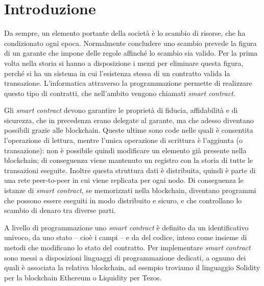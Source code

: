 \documentclass[12pt,a4paper]{report}
\begin{document}


\setcounter{secnumdepth}{3}
\setcounter{tocdepth}{1}
\tableofcontents

\hypertarget{introduzione}{%
\chapter{Introduzione}\label{introduzione}}

Da sempre, un elemento portante della società è lo scambio di risorse,
che ha condizionato ogni epoca. Normalmente concludere uno scambio
prevede la figura di un garante che impone delle regole affinché lo
scambio sia valido. Per la prima volta nella storia si hanno a
disposizione i mezzi per eliminare questa figura, perché si ha un
sistema in cui l'esistenza stessa di un contratto valida la transazione.
L'informatica attraverso la programmazione permette di realizzare questo
tipo di contratti, che nell'ambito vengono chiamati \emph{smart
contract}.

Gli \emph{smart contract} devono garantire le proprietà di fiducia,
affidabilità e di sicurezza, che in precedenza erano delegate al
garante, ma che adesso diventano possibili grazie alle blockchain.
Queste ultime sono code nelle quali è consentita l'operazione di
lettura, mentre l'unica operazione di scrittura è l'aggiunta (o
transazione): non è possibile quindi modificare un elemento già presente
nella blockchain; di conseguenza viene mantenuto un registro con la
storia di tutte le transazioni eseguite. Inoltre questa struttura dati è
distribuita, quindi è parte di una rete peer-to-peer in cui viene
replicata per ogni nodo. Di conseguenza le istanze di \emph{smart
contract}, se memorizzati nella blockchain, diventano programmi che
possono essere eseguiti in modo distribuito e sicuro, e che controllano
lo scambio di denaro tra diverse parti.

A livello di programmazione uno \emph{smart contract} è definito da un
identificativo univoco, da uno stato -- cioè i campi -- e da del codice,
inteso come insieme di metodi che modificano lo stato del contratto. Per
implementare \emph{smart contract} sono messi a disposizioni linguaggi
di programmazione dedicati, a ognuno dei quali è associata la relativa
blockchain, ad esempio troviamo il linguaggio Solidity per la blockchain
Ethereum o Liquidity per Tezos.
\end{document}
